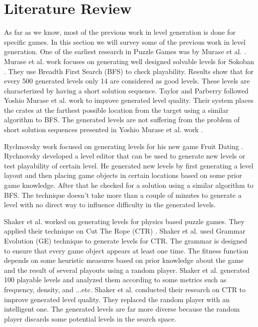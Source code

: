 \documentclass[letterpaper]{article}
\begin{document}
\section{Literature Review}
As far as we know, most of the previous work in level generation is done for specific games. In this section we will survey some of the previous work in level generation. One of the earliest research in Puzzle Games was by Murase et al. \cite{sokobanLevelGenerationOld}. Murase et al. work focuses on generating well designed solvable levels for Sokoban \citeauthor{sokoban}. They use Breadth First Search (BFS) to check playability. Results show that for every 500 generated levels only 14 are considered as good levels. These levels are characterized by having a short solution sequence. Taylor and Parberry \cite{sokobanLevelGenerationNew} followed Yoshio Murase et al. work \cite{sokobanLevelGenerationOld} to improve generated level quality. Their system places the crates at the farthest possible location from the target using a similar algorithm to BFS. The generated levels are not suffering from the problem of short solution sequences presented in Yoshio Murase et al. work \cite{sokobanLevelGenerationOld}.\\\par

Rychnovsky work \citeauthor{fruitDatingPCG} focused on generating levels for his new game Fruit Dating \citeauthor{fruitDating}. Rychnovsky developed a level editor that can be used to generate new levels or test playability of certain level. He generated new levels by first generating a level layout and then placing game objects in certain locations based on some prior game knowledge. After that he checked for a solution using a similar algorithm to BFS. The technique doesn't take more than a couple of minutes to generate a level with no direct way to influence difficulty in the generated levels.\\\par

Shaker et al. \cite{ctrAutomaticGeneration} worked on generating levels for physics based puzzle games. They applied their technique on Cut The Rope (CTR) \citeauthor{cutTheRope}. Shaker et al. used Grammar Evolution (GE) technique to generate levels for CTR. The grammar is designed to ensure that every game object appears at least one time. The fitness function depends on some heuristic measures based on prior knowledge about the game and the result of several playouts using a random player. Shaker et al. generated 100 playable levels and analyzed them according to some metrics such as frequency, density, and ...etc. Shaker et al. \cite{ctrSimulationApproach} conducted their research on CTR to improve generated level quality. They replaced the random player with an intelligent one. The generated levels are far more diverse because the random player discards some potential levels in the search space.\\\par
\end{document}
